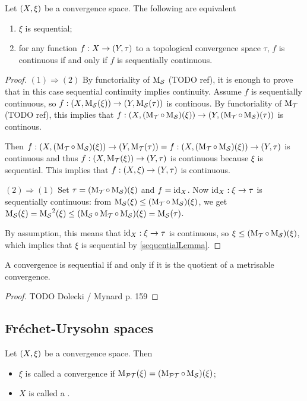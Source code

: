 \begin{proposition}
Let $\left( X,\xi \right)$ be a convergence space. The following are equivalent
\begin{enumerate}
\item $\xi$ is sequential;
\item for any function $f: X\to \left( Y,\tau \right)$ to a topological convergence space $\tau$, $f$ is continuous \textup{if and only if} $f$ is sequentially continuous.
\end{enumerate}
\end{proposition}
\begin{proof}
$(1) \Rightarrow (2)$ By functoriality of $\operatorname{M_\mathcal{S}}$ (TODO ref), it is enough to prove that in this case sequential continuity implies continuity. Assume $f$ is sequentially continuous, so $f: \left( X, \operatorname{M_\mathcal{S}}(\xi) \right) \to \left( Y, \operatorname{M_\mathcal{S}}(\tau) \right)$ is continous. By functoriality of $\operatorname{M_\mathcal{T}}$ (TODO ref), this implies that $f: \left( X, (\operatorname{M_\mathcal{T}}\circ \operatorname{M_\mathcal{S}})(\xi) \right) \to \left( Y, (\operatorname{M_\mathcal{T}}\circ\operatorname{M_\mathcal{S}})(\tau) \right)$ is continous.

Then $f: \left( X, (\operatorname{M_\mathcal{T}}\circ \operatorname{M_\mathcal{S}})(\xi) \right) \to \left( Y, \operatorname{M_\mathcal{T}}(\tau) \right) = f: \left( X, (\operatorname{M_\mathcal{T}}\circ \operatorname{M_\mathcal{S}})(\xi) \right) \to \left( Y, \tau \right)$ is continuous and thus $f: \left( X, \operatorname{M_\mathcal{T}}(\xi) \right) \to \left( Y, \tau \right)$ is continuous because $\xi$ is sequential. This implies that $f: \left( X, \xi \right) \to \left( Y, \tau \right)$ is continuous.

$(2) \Rightarrow (1)$ Set $\tau = (\operatorname{M_\mathcal{T}}\circ \operatorname{M_\mathcal{S}})(\xi)$ and $f = \operatorname{id}_X$. Now $\operatorname{id}_X: \xi \to \tau$ is sequentially continuous: from $\operatorname{M_\mathcal{S}}(\xi) \leq (\operatorname{M_\mathcal{T}}\circ \operatorname{M_\mathcal{S}})(\xi)$, we get $\operatorname{M_\mathcal{S}}(\xi) = \operatorname{M_\mathcal{S}}^2(\xi) \leq (\operatorname{M_\mathcal{S}}\circ \operatorname{M_\mathcal{T}}\circ \operatorname{M_\mathcal{S}})(\xi) = \operatorname{M_\mathcal{S}}(\tau)$.

By assumption, this means that $\operatorname{id}_X: \xi \to \tau$ is continuous, so $\xi \leq (\operatorname{M_\mathcal{T}}\circ \operatorname{M_\mathcal{S}})(\xi)$, which implies that $\xi$ is sequential by \ref{sequentialLemma}.
\end{proof}

\begin{theorem}
A convergence is sequential \textup{if and only if} it is the quotient of a metrisable convergence.
\end{theorem}
\begin{proof}
TODO Dolecki / Mynard p. 159
\end{proof}

\subsection{Fréchet-Urysohn spaces}
\begin{definition}
Let $\left( X,\xi \right)$ be a convergence space. Then
\begin{itemize}
\item $\xi$ is called a  convergence if $\operatorname{M_\mathcal{PT}}(\xi) = (\operatorname{M_\mathcal{PT}}\circ \operatorname{M_\mathcal{S}})(\xi)$;
\item $X$ is called a .
\end{itemize} 
\end{definition}

